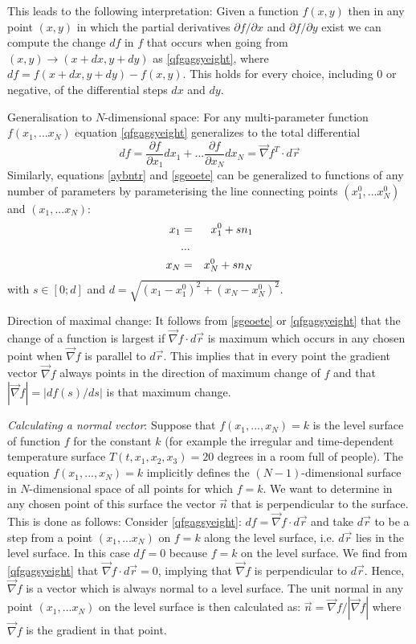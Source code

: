 This leads to the following interpretation: Given a function $f(x,y)$ 
then in any point $(x,y)$ in which the partial derivatives
$\partial f/\partial x$ and $\partial f/\partial y$ exist we can compute 
the change $df$ in $f$ that occurs when going from $(x,y) \rightarrow (x + dx, y + dy)$ as
\eqref{qfgagsyeight}, where $df =f(x + dx, y + dy) - f(x, y)$. 
This holds for every choice, including $0$ or negative, of the
differential steps $dx$ and $dy$.

Generalisation to $N$-dimensional space: For any multi-parameter function $f(x_1,...x_N)$
equation \eqref{qfgagsyeight} generalizes to the total differential
\[
df=
\frac{\partial f}{\partial x_1} dx_1
+ ...
\frac{\partial f}{\partial x_N} dx_N
=
\vec\nabla f^T \cdot d\vec{r}
\]
Similarly, equations \eqref{aybntr} and \eqref{sgeoete} can be generalized to functions of any number of
parameters by parameterising the line connecting points $(x_1^0,...x_N^0)$ and 
$(x_1,...x_N)$:
\begin{eqnarray}
x_1 &=& x_1^0 + s n_1 \nonumber\\
   & ...&  \nonumber\\
x_N &=& x_N^0 + s n_N \nonumber
\end{eqnarray}
with $s\in[0;d]$ and $d=\sqrt{(x_1-x_1^0)^2 + (x_N-x_N^0)^2}$.

Direction of maximal change: It follows from \eqref{sgeoete} or \eqref{qfgagsyeight} 
that the change of a function is
largest if $\vec\nabla f \cdot d\vec{r}$ is maximum which occurs in any chosen point when 
$\vec\nabla f$ is parallel to $d\vec{r}$.
This implies that in every point the gradient vector $\vec\nabla f$ 
always points in the direction of maximum change of $f$ and that 
$| \vec\nabla f|= | df(s)/ds |$ is that maximum change.


{\it Calculating a normal vector}:
Suppose that $f(x_1, ... ,x_N) = k$ is the level surface of function $f$
for the constant $k$ (for example the irregular and time-dependent temperature surface
$T(t,x_1,x_2,x_3) = 20$ degrees in a room full of people). 
The equation $f(x_1, ... ,x_N) = k$  implicitly defines the 
$(N-1)$-dimensional surface in $N$-dimensional space of all points for
which $f=k$. We want to determine in any chosen point of this surface the vector $\vec{n}$
that is perpendicular to the surface. This is done as follows:
Consider \eqref{qfgagsyeight}: $ df = \vec\nabla f \cdot d\vec{r}$
and take $d\vec{r}$ to be a step from a point $(x_1,...x_N)$
on $f=k$ along the level surface, 
i.e. $d\vec{r}$ lies in the level surface. 
In this case $df = 0$ because $f=k$ on the level
surface. We find from \eqref{qfgagsyeight} that $\vec\nabla f \cdot d\vec{r}=0$, 
implying that $\vec\nabla f$ is perpendicular to $d\vec{r}$. Hence,
$\vec\nabla f$ is a vector which is always normal to a level surface. The unit normal in any point
$(x_1,...x_N)$ on the level surface is then calculated as: 
$\vec{n}= \vec\nabla f/ \left|\vec\nabla f \right|$
where $\vec\nabla f$ is the gradient in that point.

